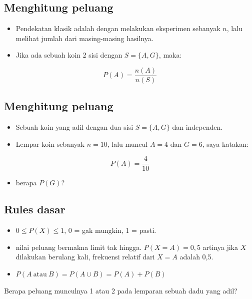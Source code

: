 \documentclass[
  letterpaper,
  DIV=11,
  numbers=noendperiod]{scrartcl}
\providecommand{\tightlist}{%
  \setlength{\itemsep}{0pt}\setlength{\parskip}{0pt}}\usepackage{longtable,booktabs,array}
\begin{document}
\subsection{Menghitung peluang}\label{menghitung-peluang}

\begin{itemize}
\item
  Pendekatan klasik adalah dengan melakukan eksperimen sebanyak \(n\),
  lalu melihat jumlah dari masing-masing hasilnya.
\item
  Jika ada sebuah koin 2 sisi dengan \(S=\{A,G\}\), maka:
\end{itemize}

\[
P(A)=\frac{n(A)}{n(S)}
\]

\subsection{Menghitung peluang}\label{menghitung-peluang-1}

\begin{itemize}
\item
  Sebuah koin yang adil dengan dua sisi \(S=\{A,G\}\) dan independen.
\item
  Lempar koin sebanyak \(n=10\), lalu muncul \(A=4\) dan \(G=6\), saya
  katakan:
\end{itemize}

\[
P(A)=\frac{4}{10}
\]

\begin{itemize}
\tightlist
\item
  berapa \(P(G)\)?
\end{itemize}

\subsection{Rules dasar}\label{rules-dasar}

\begin{itemize}
\item
  \(0 \leq P(X) \leq 1\), 0 = gak mungkin, 1 = pasti.
\item
  nilai peluang bermakna limit tak hingga. \(P(X=A)=0,5\) artinya jika
  \(X\) dilakukan berulang kali, frekuensi relatif dari \(X=A\) adalah
  0,5.
\item
  \(P(A \ \text{atau} \ B) = P(A \cup B)=P(A)+P(B)\)
\end{itemize}

Berapa peluang munculnya 1 atau 2 pada lemparan sebuah dadu yang adil?
\end{document}
